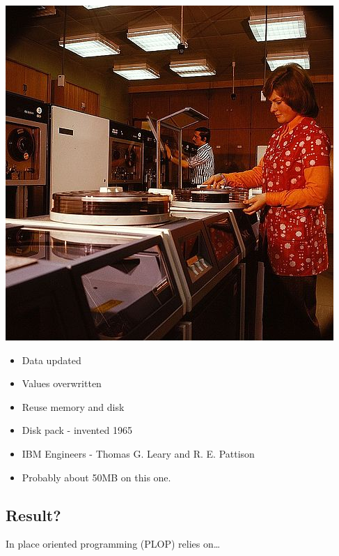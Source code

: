 \documentclass[11pt]{article}
\begin{document}
\includegraphics[width=.9\linewidth]{./disk-pack.jpg}

\begin{itemize}
\item Data updated
\end{itemize}
\begin{itemize}
\item Values overwritten
\end{itemize}
\begin{itemize}
\item Reuse memory and disk
\end{itemize}

\begin{NOTES}
\begin{itemize}
\item Disk pack - invented 1965
\item IBM Engineers - Thomas G. Leary and R. E. Pattison
\item Probably about 50MB on this one.
\end{itemize}
\end{NOTES}

\subsection*{Result?}
\label{sec:orgheadline16}

In place oriented programming (PLOP) relies on\ldots{}
\end{document}
